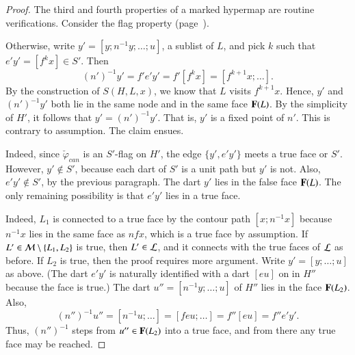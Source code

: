 \begin{proof}
The third and fourth properties of a marked hypermap are routine
verifications.  Consider the flag property (page~\pageref{def:flag}).

Otherwise, write $y' = [y;n^{-1}y;\ldots;u]$, a sublist of $L$, and
pick $k$ such that $e'y' = [f^k x]\in S'$.  Then
\[ 
(n')^{-1} y' = f'e'y' = f'[f^k x] = [f^{k+1}x;\ldots].
\] 
By the construction of $S(H,L,x)$, we know that $L$ visits $f^{k+1}x$.
Hence, $y'$ and $(n')^{-1}y'$ both lie in the same node and in the same
face ${\mathbf F}(L)$.  By the simplicity of $H'$, it follows that $y' =
(n')^{-1} y'$.  That is, $y'$ is a fixed point of $n'$.  This is contrary to
assumption. The claim ensues.


  Indeed, since
$\check\varphi_{can}$ is an $S'$-flag on $H'$, the edge $\{y',e'y'\}$
meets a true face or $S'$.  However, $y'\not\in S'$, because each dart
of $S'$ is a unit path but $y'$ is not.  Also, $e'y'\not\in S'$, by
the previous paragraph.  The dart $y'$ lies in the false face ${\mathbf F}(L)$.
The only remaining possibility is that $e'y'$ lies in a true face.



   Indeed,
$L_1$ is connected to a true face by the contour path $[x;n^{-1} x]$
because $n^{-1} x$ lies in the same face as $n f x$, which is a true
face by assumption.  If $L'\in{\cal M}\setminus\{L_1,L_2\}$ is true,
then $L'\in {\cal L}$, and it connects with the true faces of ${\cal
  L}$ as before.  If $L_2$ is true, then the proof requires more
argument.  Write $y'=[y;\ldots;u]$ as above.  (The dart $e'y'$ is
naturally identified with a dart $[e u]$ on in $H''$ because the face
is true.)  The dart $u''=[n^{-1}y;\ldots;u]$ of $H''$ lies in the face
${\mathbf F}(L_2)$.  Also,
\[ 
(n'')^{-1} u''= [n^{-1} u;\ldots] = [f e u;\ldots] = f'' [ e u]
  = f'' e' y'.
\] 
Thus, $(n'')^{-1}$ steps from $u''\in {\mathbf F}(L_2)$ into a true face, and
from there any true face may be reached.


\end{proof}
